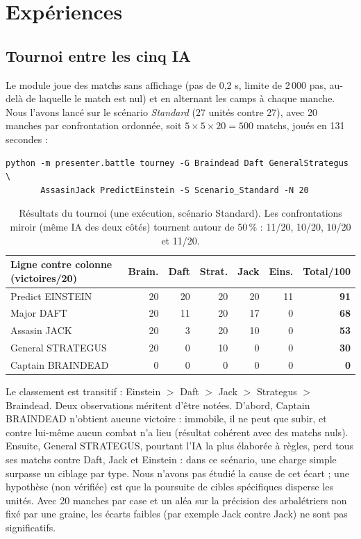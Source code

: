 \documentclass[11pt,a4paper]{article}
\newcommand{\code}[1]{\texttt{\detokenize{#1}}}
\begin{document}
\section{Exp\'eriences}

\subsection{Tournoi entre les cinq IA}

Le module \code{presenter/tournament.py} joue des matchs sans affichage (pas de 0,2 s, limite de 2\,000 pas, au-del\`a de laquelle le match est nul)
et en alternant les camps \`a chaque manche. Nous l'avons lanc\'e sur le sc\'enario \emph{Standard} (27 unit\'es contre 27), avec 20 manches par confrontation
ordonn\'ee, soit $5\times5\times20 = 500$ matchs, jou\'es en 131 secondes :
\begin{verbatim}
python -m presenter.battle tourney -G Braindead Daft GeneralStrategus \
       AssasinJack PredictEinstein -S Scenario_Standard -N 20
\end{verbatim}

\begin{table}[h]\centering\small\setlength{\tabcolsep}{4pt}
\begin{tabular}{@{}lrrrrrr@{}}
\toprule
Ligne contre colonne (victoires/20) & Brain. & Daft & Strat. & Jack & Eins. & Total/100 \\
\midrule
Predict EINSTEIN & 20 & 20 & 20 & 20 & 11 & \textbf{91} \\
Major DAFT & 20 & 11 & 20 & 17 & 0 & \textbf{68} \\
Assasin JACK & 20 & 3 & 20 & 10 & 0 & \textbf{53} \\
General STRATEGUS & 20 & 0 & 10 & 0 & 0 & \textbf{30} \\
Captain BRAINDEAD & 0 & 0 & 0 & 0 & 0 & \textbf{0} \\
\bottomrule
\end{tabular}
\caption{R\'esultats du tournoi (une ex\'ecution, sc\'enario Standard). Les confrontations miroir (m\^eme IA des deux c\^ot\'es) tournent autour de 50\,\% : 11/20, 10/20, 10/20 et 11/20.}
\end{table}

Le classement est transitif : Einstein $>$ Daft $>$ Jack $>$ Strategus $>$ Braindead. Deux observations m\'eritent d'\^etre not\'ees.
D'abord, Captain BRAINDEAD n'obtient aucune victoire : immobile, il ne peut que subir, et contre lui-m\^eme aucun combat n'a lieu (r\'esultat
coh\'erent avec des matchs nuls). Ensuite, General STRATEGUS, pourtant l'IA la plus \'elabor\'ee \`a r\`egles, perd tous ses matchs contre Daft, Jack et Einstein :
dans ce sc\'enario, une charge simple surpasse un ciblage par type. Nous n'avons pas \'etudi\'e la cause de cet \'ecart ; une hypoth\`ese (non v\'erifi\'ee) est que
la poursuite de cibles sp\'ecifiques disperse les unit\'es. Avec 20 manches par case et un al\'ea sur la pr\'ecision des arbal\'etriers non fix\'e par une graine,
les \'ecarts faibles (par exemple Jack contre Jack) ne sont pas significatifs.
\end{document}

